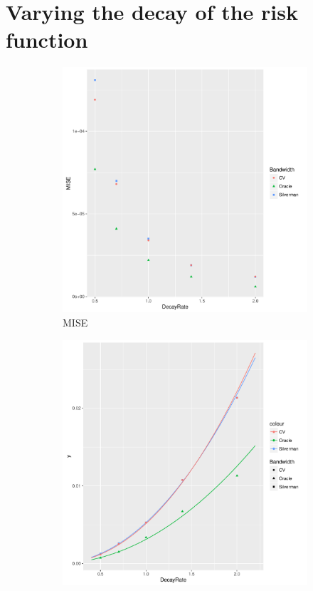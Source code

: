\section{Varying the decay of the risk function}
\label{sec:results:unif_100_SD}

\begin{figure}[htbp]
    \centering
    \begin{subfigure}[b]{0.3\textwidth}
    \includegraphics[width=\textwidth]{results/by_cases_decay/MISE-vs-risk-decay}
    \caption{MISE}
    \end{subfigure}
    \begin{subfigure}[b]{0.3\textwidth}
    \includegraphics[width=\textwidth]{results/by_cases_decay/RMISE-vs-risk-decay}

\end{subfigure}
\end{figure}
